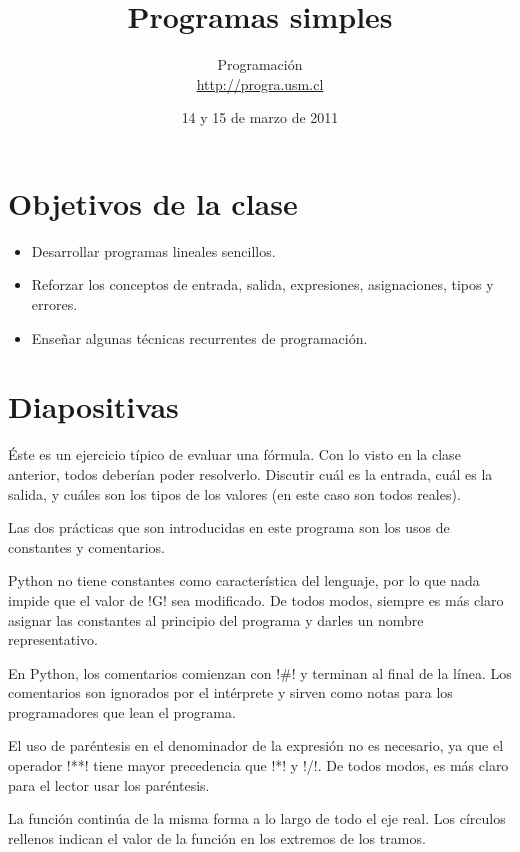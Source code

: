 \documentclass[10pt]{article}
\title{Programas simples}
\author{Programación \\ \url{http://progra.usm.cl}}
\date{14 y 15 de marzo de 2011}
\begin{document}
  \maketitle

  \section*{Objetivos de la clase}
  \begin{itemize}
    \item Desarrollar programas lineales sencillos.
    \item Reforzar los conceptos de
      entrada, salida, expresiones, asignaciones, tipos y errores.
    \item Enseñar algunas técnicas recurrentes de programación.
  \end{itemize}

  \section*{Diapositivas}


  Éste es un ejercicio típico de evaluar una fórmula.
  Con lo visto en la clase anterior,
  todos deberían poder resolverlo.
  Discutir cuál es la entrada, cuál es la salida,
  y cuáles son los tipos de los valores
  (en este caso son todos reales).


  Las dos prácticas que son introducidas en este programa son
  los usos de constantes y comentarios.

  Python no tiene constantes como característica del lenguaje,
  por lo que nada impide que el valor de \li!G! sea modificado.
  De todos modos,
  siempre es más claro asignar las constantes al principio del programa
  y darles un nombre representativo.

  En Python,
  los comentarios comienzan con \li!#! y terminan al final de la línea.
  Los comentarios son ignorados por el intérprete
  y sirven como notas para los programadores que lean el programa.

  El uso de paréntesis en el denominador de la expresión
  no es necesario, ya que el operador \li!**! tiene mayor precedencia
  que \li!*! y \li!/!. De todos modos, es más claro para el lector
  usar los paréntesis.


  La función continúa de la misma forma a lo largo de todo el eje real.
  Los círculos rellenos indican el valor de la función en los extremos de los tramos.
\end{document}
